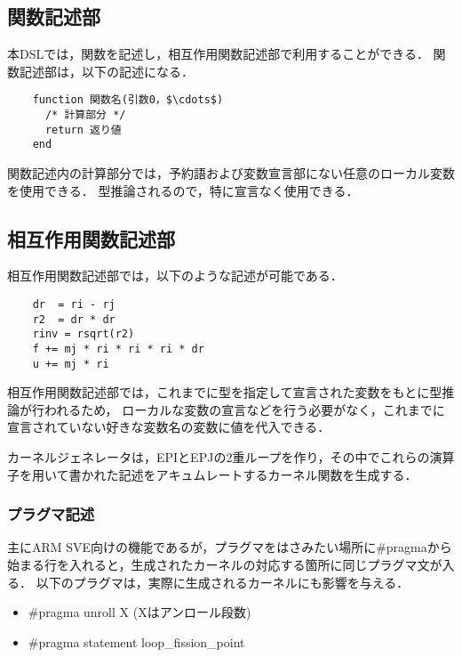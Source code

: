 \documentclass{article}
\begin{document}
\subsection{関数記述部}
本DSLでは，関数を記述し，相互作用関数記述部で利用することができる．
関数記述部は，以下の記述になる．
\begin{verbatim}
	function 関数名(引数0，$\cdots$)
	  /* 計算部分 */
	  return 返り値
	end
\end{verbatim}

関数記述内の計算部分では，予約語および変数宣言部にない任意のローカル変数を使用できる．
型推論されるので，特に宣言なく使用できる．

\subsection{相互作用関数記述部} \label{subsec:kernel}
相互作用関数記述部では，以下のような記述が可能である．
\begin{verbatim}
	dr  = ri - rj
	r2  = dr * dr
	rinv = rsqrt(r2)
	f += mj * ri * ri * ri * dr
	u += mj * ri
\end{verbatim}

相互作用関数記述部では，これまでに型を指定して宣言された変数をもとに型推論が行われるため，
ローカルな変数の宣言などを行う必要がなく，これまでに宣言されていない好きな変数名の変数に値を代入できる．

カーネルジェネレータは，EPIとEPJの2重ループを作り，その中でこれらの演算子を用いて書かれた記述をアキュムレートするカーネル関数を生成する．

\subsubsection{プラグマ記述}
主にARM SVE向けの機能であるが，プラグマをはさみたい場所に\#pragmaから始まる行を入れると，生成されたカーネルの対応する箇所に同じプラグマ文が入る．
以下のプラグマは，実際に生成されるカーネルにも影響を与える．
 \begin{itemize}
  \item \#pragma unroll X (Xはアンロール段数)
  \item \#pragma statement loop\_fission\_point
 \end{itemize}

\end{document}
